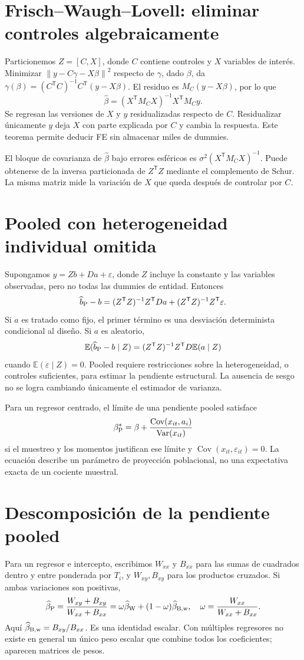\documentclass[11pt,a4paper]{article}
\newcommand{\E}{\mathbb E}
\newcommand{\T}{^{\mathsf T}}
\newcommand{\norm}[1]{\left\lVert #1\right\rVert}
\DeclareMathOperator{\Var}{Var}
\DeclareMathOperator{\Cov}{Cov}
\theoremstyle{definition}
\newcommand{\eps}{\varepsilon}
\begin{document}
\section{Frisch--Waugh--Lovell: eliminar controles algebraicamente}
Particionemos $Z=[C,X]$, donde $C$ contiene controles y $X$ variables de interés. Minimizar $\norm{y-C\gamma-X\beta}^2$ respecto de $\gamma$, dado $\beta$, da
$\gamma(\beta)=(C\T C)^{-1}C\T(y-X\beta)$.
El residuo es $M_C(y-X\beta)$, por lo que
\[
\widehat\beta=(X\T M_CX)^{-1}X\T M_Cy.
\]
Se regresan las versiones de $X$ y $y$ residualizadas respecto de $C$. Residualizar únicamente $y$ deja $X$ con parte explicada por $C$ y cambia la respuesta. Este teorema permite deducir FE sin almacenar miles de dummies.

El bloque de covarianza de $\widehat\beta$ bajo errores esféricos es
$\sigma^2(X\T M_CX)^{-1}$. Puede obtenerse de la inversa particionada de $Z\T Z$ mediante el complemento de Schur. La misma matriz mide la variación de $X$ que queda después de controlar por $C$.

\section{Pooled con heterogeneidad individual omitida}
Supongamos $y=Zb+Da+\eps$, donde $Z$ incluye la constante y las variables observadas, pero no todas las dummies de entidad. Entonces
\[
\widehat b_{\rm P}-b=(Z\T Z)^{-1}Z\T Da+(Z\T Z)^{-1}Z\T\eps.
\]
Si $a$ es tratado como fijo, el primer término es una desviación determinista condicional al diseño. Si $a$ es aleatorio,
\[
\E(\widehat b_{\rm P}-b\mid Z)
=(Z\T Z)^{-1}Z\T D\E(a\mid Z)
\]
cuando $\E(\eps\mid Z)=0$. Pooled requiere restricciones sobre la heterogeneidad, o controles suficientes, para estimar la pendiente estructural. La ausencia de sesgo no se logra cambiando únicamente el estimador de varianza.

Para un regresor centrado, el límite de una pendiente pooled satisface
\[
\beta_{\rm P}^{*}
=\beta+\frac{\Cov(x_{it},a_i)}{\Var(x_{it})}
\]
si el muestreo y los momentos justifican ese límite y $\Cov(x_{it},\eps_{it})=0$. La ecuación describe un parámetro de proyección poblacional, no una expectativa exacta de un cociente muestral.

\section{Descomposición de la pendiente pooled}
Para un regresor e intercepto, escribimos $W_{xx}$ y $B_{xx}$ para las sumas de cuadrados dentro y entre ponderada por $T_i$, y $W_{xy},B_{xy}$ para los productos cruzados. Si ambas variaciones son positivas,
\[
\widehat\beta_{\rm P}
=\frac{W_{xy}+B_{xy}}{W_{xx}+B_{xx}}
=\omega\widehat\beta_{\rm W}+(1-\omega)\widehat\beta_{\rm B,w},
\quad
\omega=\frac{W_{xx}}{W_{xx}+B_{xx}}.
\]
Aquí $\widehat\beta_{\rm B,w}=B_{xy}/B_{xx}$. Es una identidad escalar. Con múltiples regresores no existe en general un único peso escalar que combine todos los coeficientes; aparecen matrices de pesos.
\end{document}
